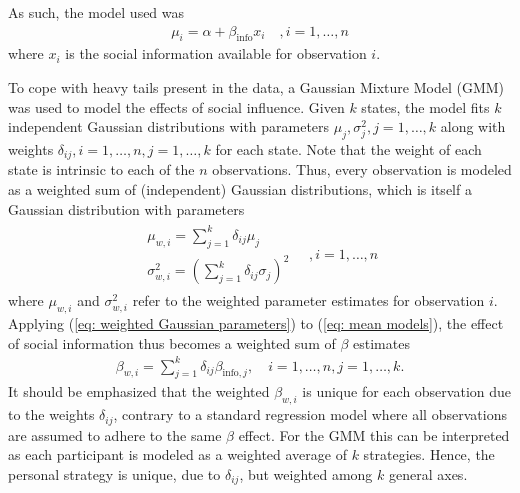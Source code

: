 \documentclass[10pt,a4paper,twocolumn,lineno]{article}
\begin{document}
As such, the model used was
\begin{align}
	\mu_i = \alpha+\beta_\text{info} x_i \quad, i=1,\dots,n  \label{eq: mean models}
\end{align}
where $x_i$ is the social information available %
for observation $i$.

To cope with heavy tails present in the data, a Gaussian Mixture Model (GMM) was used to model the effects of social influence. Given $k$ states, the model fits $k$ independent Gaussian distributions with parameters $\mu_j, \sigma^2_j, j=1,\dots,k$ along with weights $\delta_{ij}, i=1,\dots, n, j=1,\dots ,k$ for each state. Note that the weight of each state is intrinsic to each of the $n$ observations. Thus, every observation is modeled as a weighted sum of (independent) Gaussian distributions, which is itself a Gaussian distribution with parameters
\begin{align}
\begin{array}{l}
	\mu_{w,i} = \sum_{j=1}^k \delta_{ij} \mu_j \\
	\sigma^2_{w,i} = \left(\sum_{j=1}^k \delta_{ij} \sigma_j\right)^2
\end{array} \quad, i=1,\dots,n \label{eq: weighted Gaussian parameters}
\end{align}
where $\mu_{w,i}$ and $\sigma^2_{w,i}$ refer to the weighted parameter estimates for observation $i$. Applying (\ref{eq: weighted Gaussian parameters}) to (\ref{eq: mean models}), the effect of social information thus becomes a weighted sum of $\beta$ estimates
\begin{align}
	\beta_{w,i} = \sum_{j=1}^k \delta_{ij} \beta_{\text{info},j}, \quad i=1,\dots, n, j=1,\dots, k. \label{eq: weighted beta}
\end{align}
It should be emphasized that the weighted $\beta_{w,i}$ is unique for each observation due to the weights $\delta_{ij}$, contrary to a standard regression model where all observations are assumed to adhere to the same $\beta$ effect. For the GMM this can be interpreted as each participant is modeled as a weighted average of $k$ strategies. Hence, the personal strategy is unique, due to $\delta_{ij}$, but weighted among $k$ general axes. 
\end{document}
